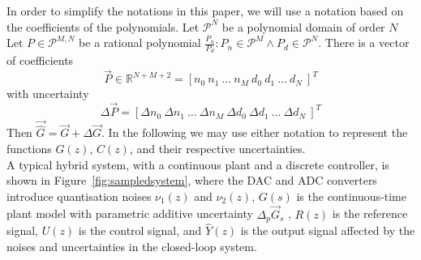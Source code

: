 \documentclass{sig-alternate-05-2015}
\begin{document}
In order to simplify the notations in this paper, we will use a notation
based on the coefficients of the polynomials.  Let $\mathcal{P}^{N}$ be a
polynomial domain of order $N$ Let $P \in \mathcal{P}^{M,N}$ be a rational
polynomial $\frac{P_n}{P_d} : P_n \in \mathcal{P}^{M} \wedge P_d \in
\mathcal{P}^{N}$.  There is a vector of coefficients
%
\begin{equation}
\vec{P} \in \mathbb{R}^{N+M+2}=[n_{0}\ n_{1}\ \hdots \ n_{M}\ d_{0}\ d_{1}\ \hdots\ d_{N}\ ]^T
\label{eq:coefficients}
\end{equation}
%
with uncertainty
%
\begin{equation}
\Delta{\vec{P}}=[\Delta{n}_{0}\ \Delta{n}_{1}\ \hdots \ \Delta{n}_{M}\ \Delta{d}_{0}\ \Delta{d}_{1}\ \hdots\ \Delta{d}_{N}\ ]^T
\label{eq:coefficients}
\end{equation}
%
Then $\vec{\hat{G}}=\vec{G}+\Delta{\vec{G}}$.  In the following we may use
either notation to represent the functions $G(z)$, $C(z)$, and their
respective uncertainties.\\


A typical hybrid system, with a continuous plant and a discrete controller,
is shown in Figure~\ref{fig:sampledsystem}, where the DAC and ADC converters
introduce quantisation noises $\nu_{1}(z)$ and $\nu_{2}(z)$, $G(s)$ is the
continuous-time plant model with parametric additive uncertainty $\Delta_p
\vec{G}_s$ , $R(z)$ is the reference signal, $U(z)$ is the control signal,
and $\hat{Y}(z)$ is the output signal affected by the noises and
uncertainties in the closed-loop system.
\end{document}
